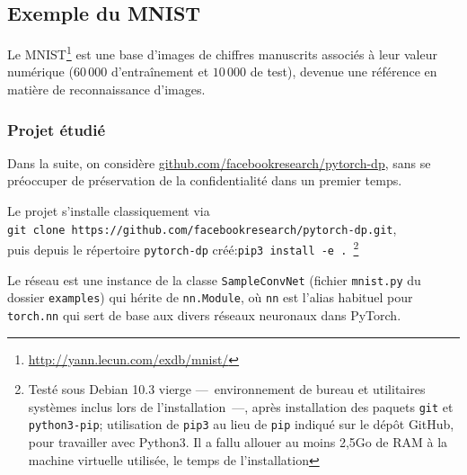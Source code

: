 \documentclass[a4paper,11pt]{article} %
\newcommand{\ttt}[1]{\texttt{#1}}
\begin{document}
\subsection{Exemple du MNIST}
Le MNIST\footnote{\url{http://yann.lecun.com/exdb/mnist/}} est une base d'images de chiffres manuscrits associés à leur valeur numérique ($60\,000$  d'entraînement et $10\,000$ de test), devenue une référence en matière de reconnaissance d'images.

\subsubsection{Projet étudié}
Dans la suite, on considère \url{github.com/facebookresearch/pytorch-dp}, sans se préoccuper de préservation de la confidentialité dans un premier temps.

Le projet s'installe classiquement via\\\ttt{git clone https://github.com/facebookresearch/pytorch-dp.git},\\ puis depuis le répertoire \ttt{pytorch-dp} créé:\quad \ttt{pip3 install -e . }\footnote{Testé sous Debian 10.3 vierge ---~environnement de bureau et utilitaires systèmes inclus lors de l'installation~---, après installation des paquets \ttt{git} et \ttt{python3-pip}; utilisation de \ttt{pip3} au lieu de \ttt{pip} indiqué sur le dépôt GitHub, pour travailler avec Python3. Il a fallu allouer au moins 2,5Go de RAM à la machine virtuelle utilisée, le temps de l'installation}

Le réseau est une instance de la classe \ttt{SampleConvNet} (fichier \ttt{mnist.py} du dossier \ttt{examples}) qui hérite de \ttt{nn.Module}, où \ttt{nn} est l'alias habituel pour \ttt{torch.nn} qui sert de base aux divers réseaux neuronaux dans \textsf{PyTorch}.
\end{document}
